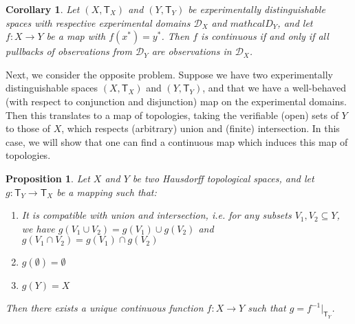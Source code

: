 \documentclass[review]{elsarticle}
\theoremstyle{plain}%
\newtheorem{prop}[thm]{Proposition}
\newtheorem{cor}{Corollary}
\theoremstyle{definition}
\theoremstyle{remark}
\begin{document}
\begin{cor}
Let $(X,\mathsf{T}_X)$ and $(Y,\mathsf{T}_Y)$ be experimentally distinguishable spaces with respective experimental domains $\mathcal{D}_X$ and $mathcal{D}_Y$, and let $f:X\to Y$ be a map with $f(x^*)=y^*$. Then $f$ is continuous if and only if all pullbacks of observations from $\mathcal{D}_Y$ are observations in $\mathcal{D}_X$.
\end{cor}


Next, we consider the opposite problem. Suppose we have two experimentally distinguishable spaces $(X,\mathsf{T}_X)$ and $(Y,\mathsf{T}_Y)$, and that we have a well-behaved (with respect to conjunction and disjunction) map on the experimental domains. Then this translates to a map of topologies, taking the verifiable (open) sets of $Y$ to those of $X$, which respects (arbitrary) union and (finite) intersection. In this case, we will show that one can find a continuous map which induces this map of topologies. 






\begin{prop}
	\label{setfunctions}
	Let $X$ and $Y$ be two Hausdorff topological spaces, and let $g: \mathsf{T}_Y \rightarrow \mathsf{T}_X$ be a mapping such that:
	\begin{enumerate}
		\item It is compatible with union and intersection, i.e. for any subsets $V_1, V_2 \subseteq Y$, we have $g(V_1 \cup V_2)=g(V_1)\cup g(V_2)$ and $g(V_1 \cap V_2)=g(V_1)\cap g(V_2)$
		\item $g(\emptyset) = \emptyset$
		\item $g(Y) = X$
	\end{enumerate}
	Then there exists a unique continuous function $f: X \rightarrow Y$ such that $g = f^{-1} |_{\mathsf{T}_Y}$.
\end{prop}
\end{document}
